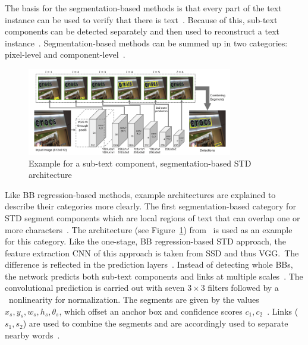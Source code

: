 The basis for the segmentation-based methods is that every part of the text instance can
be used to verify that there is text~\citep{long_scene_2021}.
Because of this, sub-text components can be detected separately and then used to reconstruct a text
instance~\citep{long_scene_2021}.
Segmentation-based methods can be summed up in two categories: pixel-level and
component-level~\citep{long_scene_2021}.
\begin{figure}[hb]
    \centering
    \includegraphics[width=0.8\textwidth]{img/STD-seg-based-architecture-Shi-Detecting-2017.png}
    \caption[Sub-text component, segmentation-based STD architecture]{%
        Example for a sub-text component, segmentation-based STD
        architecture~\citep{shi_detecting_2017}\label{fig:STD-segbased-component-architecture}
    }
\end{figure}
Like \ac{BB} regression-based methods, example architectures are explained to
describe their categories more clearly.
The first segmentation-based category for \ac{STD} segment components which are local regions of
text that can overlap one or more characters~\citep{long_scene_2021}.
The architecture (see Figure~\ref{fig:STD-segbased-component-architecture})
from~\cite{shi_detecting_2017} is used as an example for this category.
Like the one-stage, \ac{BB} regression-based \ac{STD} approach, the feature extraction \ac{CNN} of
this approach is taken from \ac{SSD} and thus VGG.\
The difference is reflected in the prediction
layers~\citep{shi_detecting_2017,liu_ssd_2016,simonyan_very_2015}.
Instead of detecting whole \acp{BB}, the network predicts both sub-text components and links at
multiple scales~\citep{shi_detecting_2017}.
The convolutional prediction is carried out with seven $3\times3$ filters followed by a \sfmx\
nonlinearity for normalization.
The segments are given by the values $x_s,y_s,w_s,h_s,\theta_s$, which offset an anchor box and
confidence scores $c_1,c_2$~\citep{shi_detecting_2017}.
Links ($s_1,s_2$) are used to combine the segments and are accordingly used to separate nearby
words~\citep{shi_detecting_2017}.
